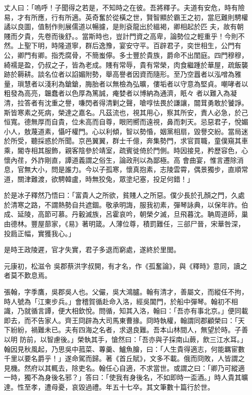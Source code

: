 \begin{pinyinscope}
 丈人曰：「嗚呼！子聞得之若是，不知時之在彼。吾將釋子。夫道有安危，時有險易，才有所應，行有所適。英奇奮於從橫之世，賢智顯於霸王之初，當厄難則騁權譎以良圖，值制作則展儒道以暢攄，是則袞龍出於縕褐，卿相起於匹
 夫，故有朝賤而夕貴，先卷而後舒。。當斯時也，豈計門資之高卑，論勢位之輕重乎！今則不然。上聖下明，時隆道寧，群后逸豫，宴安守平。百辟君子，奕世相生，公門有公，卿門有卿。指禿腐骨，不簡蚩儜。多士豐於貴族，爵命不出閨庭。四門穆穆，綺襦是盈，仍叔之子，皆為老成。賤有常辱，貴有常榮，肉食繼踵於華屋，疏飯襲跡於耨耕。談名位者以諂媚附勢，舉高譽者因資而隨形。至乃空囂者以泓噌為雅量，瑣慧者以淺利為鎗鎗，脢胎者以無檢為弘曠，僂垢者以守意為堅貞。嘲哮者以粗發為高亮，韞蠢者以色厚為篤誠，痷婪者以博納為通濟，眂々
 者以難入為凝清，拉答者有沈重之譽，嗛閃者得清剿之聲，嗆啍怯畏於謙讓，闒茸勇敢於饕諍。斯皆寒素之死病，榮達之嘉名。凡茲流也，視其用心，察其所安，責人必急，於己恒寬。德無厚而自貴，位未高而自尊，眼罔嚮而遠視，鼻而刺天。忌惡君子，悅媚小人，敖蔑道素，懾吁權門。心以利傾，智以勢惛，姻黨相扇，毀譽交紛。當局迷於所受，聽採惑於所聞。京邑翼翼，群士千億，奔集勢門，求官買職，童僕窺其車乘，閽寺相其服飾，親客陰參於靖室，疏賓徙倚於門側。時因接見，矜歷容色，心懷內荏，外詐剛直，譚道義謂之俗生，論政刑以為鄙極。高
 會曲宴，惟言遷除消息，官無大小，問是誰力。今以子孤寒，懷真抱素，志陵雲霄，偶景獨步，直順常道，關津難渡，欲騁韓盧，時無狡兔，眾塗圮塞，投足何錯！」



 於是冰子釋然乃悟曰：「富貴人之所欲，貧賤人之所惡。僕少長於孔顏之門，久處於清寒之路，不謂熱勢自共遮錮。敬承明誨，服我初素，彈琴詠典，以保年祚。伯成、延陵，高節可慕。丹轂滅族，呂霍哀吟，朝榮夕滅，旦飛暮沈。聃周道師，巢由德林。豐屋蔀家，《易》著明箴。人薄位尊，積罰難任，三郤尸晉，宋華咎深，投扃正幅，實獲我心。」



 是時王政陵遲，官才失實，君子多退而窮處，遂終於里閭。



 元康初，松滋令
 吳郡蔡洪字叔開，有才名，作《孤奮論》，與《釋時》意同，讀之者莫不歎息焉。



 張翰，字季鷹，吳郡吳人也。父儼，吳大鴻臚。翰有清才，善屬文，而縱任不拘，時人號為「江東步兵。」會稽賀循赴命入洛，經吳閶門，於船中彈琴。翰初不相識，乃就循言譚，便大相欽悅。問循，知其入洛，翰曰：「吾亦有事北京。」便同載即去，而不告家人。齊王冏辟為大司馬東曹掾。冏時執權，翰謂同郡顧榮曰：「天下紛紛，禍難未已。夫有四海之名者，求退良難。吾本山林間人，無望於時。子善以明
 防前，以智慮後。」榮執其手，愴然曰：「吾亦與子採南山蕨，飲三江水耳。」翰因見秋風起，乃思吳中菰菜、蓴羹、鱸魚膾，曰：「人生貴得適志，何能羈宦數千里以要名爵乎！」遂命駕而歸。著《首丘賦》，文多不載。俄而冏敗，人皆謂之見機。然府以其輒去，除吏名。翰任心自適，不求當世。或謂之曰：「卿乃可縱適一時，獨不為身後名邪？」答曰：「使我有身後名，不如即時一盃酒。」時人貴其曠達。性至孝，遭母憂，哀毀過禮。年五十七卒。其文筆數十篇行於世。




\end{pinyinscope}
